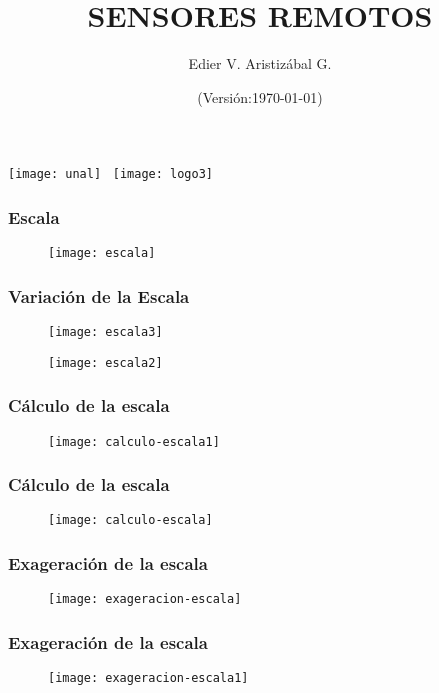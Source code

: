 \documentclass[14pt]{beamer}
\title[Fotogrametría]{SENSORES REMOTOS}
\author[Edier Aristizábal]{Edier V. Aristizábal G.}
\institute{\emph{evaristizabalg@unal.edu.co}}
\date{(Versión:\today)}
\begin{document}
\begin{frame}
\titlepage
\centering
	\texttt{[image: unal]}\hspace*{4.75cm}~%
   	\texttt{[image: logo3]} 
\end{frame}
 \begin{frame}
\frametitle{Escala}
 \begin{figure}
    \centering
    \texttt{[image: escala]}
  \end{figure}
\end{frame}
\begin{frame}
\frametitle{Variación de la Escala}
 \begin{figure}
    \centering
    \texttt{[image: escala3]}
  \end{figure}
\end{frame}
\begin{frame}
 \begin{figure}
    \centering
    \texttt{[image: escala2]}
  \end{figure}
\end{frame}
\begin{frame}
\frametitle{Cálculo de la escala}
 \begin{figure}
    \centering
    \texttt{[image: calculo-escala1]}
  \end{figure}
\end{frame}
\begin{frame}
\frametitle{Cálculo de la escala}
 \begin{figure}
    \centering
    \texttt{[image: calculo-escala]}
  \end{figure}
\end{frame}
\begin{frame}
\frametitle{Exageración de la escala}
 \begin{figure}
    \centering
    \texttt{[image: exageracion-escala]}
  \end{figure}
\end{frame}
\begin{frame}
\frametitle{Exageración de la escala}
 \begin{figure}
    \centering
    \texttt{[image: exageracion-escala1]}
  \end{figure}
\end{frame}
\end{document}
